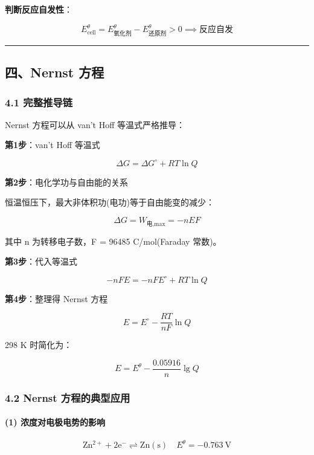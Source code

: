 \textbf{判断反应自发性}：

\[
E_{\text{cell}}^\theta = E^\theta_{\text{氧化剂}} - E^\theta_{\text{还原剂}} > 0 \implies \text{反应自发}
\]

\begin{center}\rule{0.5\linewidth}{0.5pt}\end{center}

\subsection{四、Nernst 方程}\label{ux56dbnernst-ux65b9ux7a0b}

\subsubsection{4.1 完整推导链}\label{ux5b8cux6574ux63a8ux5bfcux94fe}

Nernst 方程可以从 van't Hoff 等温式严格推导：

\textbf{第1步}：van't Hoff 等温式

\[\Delta G = \Delta G^\circ + RT\ln Q\]

\textbf{第2步}：电化学功与自由能的关系

恒温恒压下，最大非体积功(电功)等于自由能变的减少：

\[\Delta G = W_{\text{电,max}} = -nEF\]

其中 n 为转移电子数，F = 96485 C/mol(Faraday 常数)。

\textbf{第3步}：代入等温式

\[-nFE = -nFE^\circ + RT\ln Q\]

\textbf{第4步}：整理得 Nernst 方程

\[\boxed{E = E^\circ - \frac{RT}{nF}\ln Q}\]

298 K 时简化为：

\[E = E^\theta - \frac{0.05916}{n}\lg Q\]

\subsubsection{4.2 Nernst 方程的典型应用}\label{nernst-ux65b9ux7a0bux7684ux5178ux578bux5e94ux7528}

\paragraph{(1) 浓度对电极电势的影响}\label{ux6d53ux5ea6ux5bf9ux7535ux6781ux7535ux52bfux7684ux5f71ux54cd}

\[
\mathrm{Zn^{2+} + 2e^- \rightleftharpoons Zn(s)} \quad E^\theta = -0.763\ \mathrm{V}
\]

